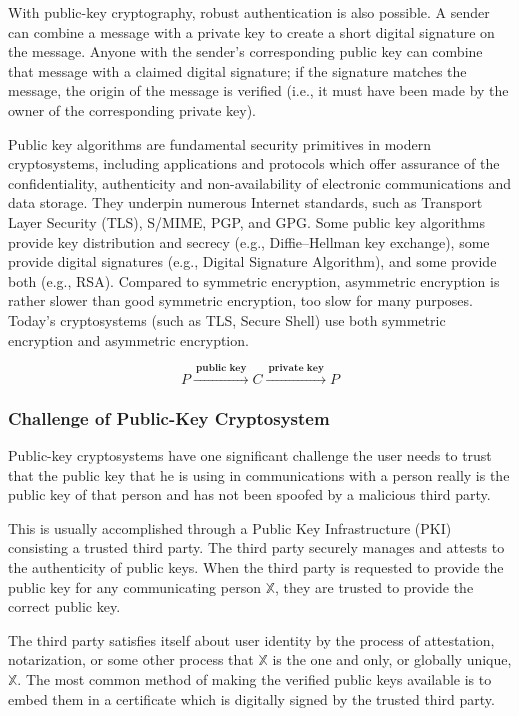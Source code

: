\documentclass[british]{article}
\begin{document}
With public-key cryptography, robust authentication is also possible.
A sender can combine a message with a private key to create a short
digital signature on the message. Anyone with the sender's corresponding
public key can combine that message with a claimed digital signature;
if the signature matches the message, the origin of the message is
verified (i.e., it must have been made by the owner of the corresponding
private key).

Public key algorithms are fundamental security primitives in modern
cryptosystems, including applications and protocols which offer assurance
of the confidentiality, authenticity and non-availability of electronic
communications and data storage. They underpin numerous Internet standards,
such as Transport Layer Security (TLS), S/MIME, PGP, and GPG. Some
public key algorithms provide key distribution and secrecy (e.g.,
Diffie--Hellman key exchange), some provide digital signatures (e.g.,
Digital Signature Algorithm), and some provide both (e.g., RSA). Compared
to symmetric encryption, asymmetric encryption is rather slower than
good symmetric encryption, too slow for many purposes. Today's cryptosystems
(such as TLS, Secure Shell) use both symmetric encryption and asymmetric
encryption.

\[
P\xrightarrow{\:\textbf{public key}\:}C\xrightarrow{\:\textbf{private key}\:}P
\]

\medskip{}


\subsubsection{Challenge of Public-Key Cryptosystem}

Public-key cryptosystems have one significant challenge \textminus{}
the user needs to trust that the public key that he is using in communications
with a person really is the public key of that person and has not
been spoofed by a malicious third party.

This is usually accomplished through a Public Key Infrastructure (PKI)
consisting a trusted third party. The third party securely manages
and attests to the authenticity of public keys. When the third party
is requested to provide the public key for any communicating person
$\mathbb{X}$, they are trusted to provide the correct public key.

The third party satisfies itself about user identity by the process
of attestation, notarization, or some other process \textminus{} that
$\mathbb{X}$ is the one and only, or globally unique, $\mathbb{X}$.
The most common method of making the verified public keys available
is to embed them in a certificate which is digitally signed by the
trusted third party.
\end{document}
